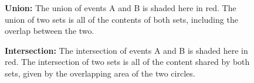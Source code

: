 \documentclass[
  letterpaper,
  DIV=11,
  numbers=noendperiod]{scrreprt}
\theoremstyle{definition}
\theoremstyle{definition}
\theoremstyle{definition}
\theoremstyle{remark}
\begin{document}
\begin{figure}[H]

\caption{\label{fig-venn-diagram-union}\textbf{Union:} The union of
events A and B is shaded here in red. The union of two sets is all of
the contents of both sets, including the overlap between the two.}


\end{figure}%

\begin{figure}[H]

\caption{\label{fig-venn-diagram-intersection}\textbf{Intersection:} The
intersection of events A and B is shaded here in red. The intersection
of two sets is all of the content shared by both sets, given by the
overlapping area of the two circles.}


\end{figure}%
\end{document}
